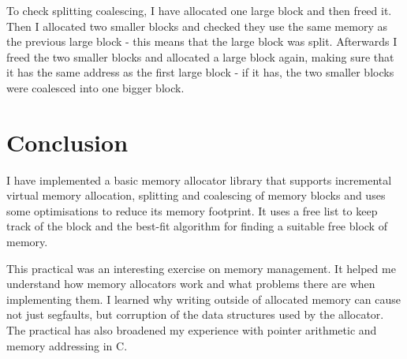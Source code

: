 \documentclass{article}
\begin{document}
To check splitting coalescing, I have allocated one large block and then freed it. Then I allocated two smaller blocks and checked they use the same memory as the previous large block - this means that the large block was split. Afterwards I freed the two smaller blocks and allocated a large block again, making sure that it has the same address as the first large block - if it has, the two smaller blocks were coalesced into one bigger block.

\section{Conclusion}

I have implemented a basic memory allocator library that supports incremental virtual memory allocation, splitting and coalescing of memory blocks and uses some optimisations to reduce its memory footprint. It uses a free list to keep track of the block and the best-fit algorithm for finding a suitable free block of memory.

This practical was an interesting exercise on memory management. It helped me understand how memory allocators work and what problems there are when implementing them. I learned why writing outside of allocated memory can cause not just segfaults, but corruption of the data structures used by the allocator. The practical has also broadened my experience with pointer arithmetic and memory addressing in C.



\end{document}
